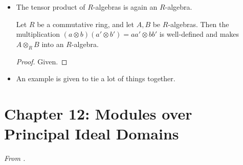 \documentclass[../notes.tex]{subfiles}
\begin{document}
\begin{itemize}
\begin{itemize}
    \end{itemize}
    \item The tensor product of $R$-algebras is again an $R$-algebra.
    \begin{proposition}\label{prp:10.21}
        Let $R$ be a commutative ring, and let $A,B$ be $R$-algebras. Then the multiplication $(a\otimes b)(a'\otimes b')=aa'\otimes bb'$ is well-defined and makes $A\otimes_RB$ into an $R$-algebra.
        \begin{proof}
            Given.
        \end{proof}
    \end{proposition}
    \item An example is given to tie a lot of things together.
\end{itemize}



\section{Chapter 12: Modules over Principal Ideal Domains}
\emph{From \textcite{bib:DummitFoote}.}
\setcounter{bookch}{12}
\setcounter{proposition}{11}
\end{document}
